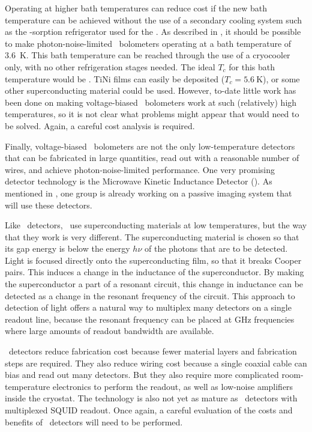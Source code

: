 Operating at higher bath temperatures can reduce cost if the new bath temperature can be achieved without the use of a secondary cooling system such as the -sorption refrigerator used for the \Imager.
As described in , it should be possible to make photon-noise-limited \TES\ bolometers operating at a bath temperature of \SI{3.6}{\K}.
This bath temperature can be reached through the use of a cryocooler only, with no other refrigeration stages needed. 
The ideal $T_c$ for this bath temperature would be .
TiNi films can easily be deposited ($T_c = \SI{5.6}{\K}$), or some other superconducting material could be used.
However, to-date little work has been done on making voltage-biased \TES\ bolometers work at such (relatively) high temperatures, so it is not clear what problems might appear that would need to be solved.
Again, a careful cost analysis is required.

Finally, voltage-biased \TES\ bolometers are not the only low-temperature detectors that can be fabricated in large quantities, read out with a reasonable number of wires, and achieve photon-noise-limited performance.
One very promising detector technology is the Microwave Kinetic Inductance Detector (\MKID).
As mentioned in , one group is already working on a passive imaging system that will use these detectors.

Like \TES\ detectors, \MKIDs\ use superconducting materials at low temperatures, but the way that they work is very different.
The superconducting material is chosen so that its gap energy is below the energy $h \nu$ of the photons that are to be detected.
Light is focused directly onto the superconducting film, so that it breaks Cooper pairs.
This induces a change in the inductance of the superconductor.
By making the superconductor a part of a resonant circuit, this change in inductance can be detected as a change in the resonant frequency of the circuit.
This approach to detection of light offers a natural way to multiplex many detectors on a single readout line, because the resonant frequency can be placed at \si{\GHz} frequencies where large amounts of readout bandwidth are available.

\MKID\ detectors reduce fabrication cost because fewer material layers and fabrication steps are required.
They also reduce wiring cost because a single coaxial cable can bias and read out many detectors.
But they also require more complicated room-temperature electronics to perform the readout, as well as low-noise amplifiers inside the cryostat.
The technology is also not yet as mature as \TES\ detectors with multiplexed SQUID readout.
Once again, a careful evaluation of the costs and benefits of \MKID\ detectors will need to be performed.

